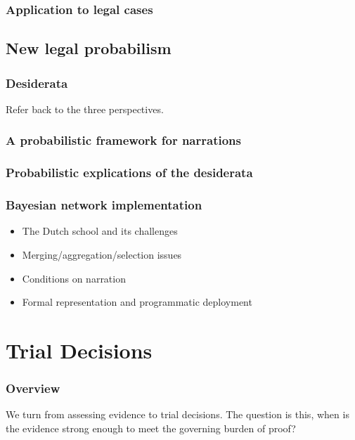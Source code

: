 \documentclass[]{book}
\begin{document}
\section{Application to legal cases}

\chapter{New legal probabilism}

\section{Desiderata}

Refer back to the three perspectives.

\section{A probabilistic framework for narrations}

\section{Probabilistic explications of the desiderata}

\section{Bayesian network implementation}


\begin{itemize}
\item
  The Dutch school and its challenges
\item
  Merging/aggregation/selection issues
\item
  Conditions on narration
\item
  Formal representation and programmatic deployment
\end{itemize}

\part{Trial Decisions}

\section*{Overview}

We turn from assessing
evidence to trial decisions.
The question is this, when is the evidence strong
enough to meet the governing burden of proof?
\end{document}
